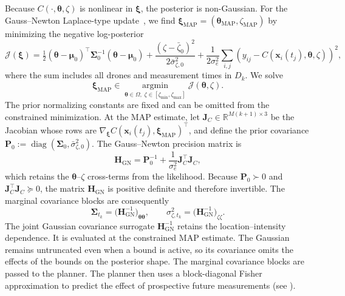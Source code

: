 \documentclass{article}
\DeclareMathOperator{\diag}{diag}
\newcommand{\R}{\mathbb{R}}
\newcommand{\bs}[1]{\boldsymbol{#1}}
\newcommand{\x}{\mathbf{x}}
\begin{document}
Because $C(\cdot,\bs\theta,\zeta)$ is nonlinear in $\bs\xi$, the posterior is non-Gaussian.
For the Gauss--Newton Laplace-type update~\cite{laplace_approx}, we find $\bs\xi_{\text{MAP}}=(\bs\theta_{\text{MAP}},\zeta_{\text{MAP}})$ by minimizing the negative log-posterior
\begin{equation}
\label{eq:neg_log_post}
\mathcal J(\bs\xi)=
\tfrac12(\bs\theta-\bs\mu_0)^\top\bs\Sigma_0^{-1}(\bs\theta-\bs\mu_0)
+\frac{(\zeta-\bar\zeta_0)^2}{2\bar\sigma_{\zeta,0}^2}
+\frac{1}{2\sigma_e^2}\sum_{i,j}
\!\left(y_{ij}-C(\x_i(t_j),\bs\theta,\zeta)\right)^2,
\end{equation}
where the sum includes all drones and measurement times in $D_k$.
We solve
\begin{equation}
\bs\xi_{\mathrm{MAP}}
\in \operatorname*{argmin}_{\bs\theta\in\Omega,\;\zeta\in[\zeta_{\min},\zeta_{\max}]}
\mathcal J(\bs\theta,\zeta).
\end{equation}
The prior normalizing constants are fixed and can be omitted from the constrained minimization.
At the MAP estimate, let $\bs J_C\in\R^{M(k+1)\times3}$ be the Jacobian whose rows are $\nabla_{\bs\xi}C(\x_i(t_j),\bs\xi_{\mathrm{MAP}})^\top$, and define the prior covariance $\bs P_0:=\diag(\bs\Sigma_0,\bar\sigma_{\zeta,0}^2)$.
The Gauss--Newton precision matrix is
\begin{equation}
\label{eq:gauss_newton_precision}
\bs H_{\mathrm{GN}}
=\bs P_0^{-1}+\frac{1}{\sigma_e^2}\bs J_C^\top\bs J_C,
\end{equation}
which retains the $\bs\theta$--$\zeta$ cross-terms from the likelihood.
Because $\bs P_0\succ0$ and $\bs J_C^\top\bs J_C\succeq0$, the matrix $\bs H_{\mathrm{GN}}$ is positive definite and therefore invertible.
The marginal covariance blocks are consequently
\begin{equation}
\label{eq:laplace_cov}
\bs\Sigma_{t_k} = \bigl(\bs H_{\mathrm{GN}}^{-1}\bigr)_{\bs\theta\bs\theta},
\qquad
\sigma_{\zeta,t_k}^2 = \bigl(\bs H_{\mathrm{GN}}^{-1}\bigr)_{\zeta\zeta}.
\end{equation}
The joint Gaussian covariance surrogate $\bs H_{\mathrm{GN}}^{-1}$ retains the location--intensity dependence.
It is evaluated at the constrained MAP estimate.
The Gaussian remains untruncated even when a bound is active, so its covariance omits the effects of the bounds on the posterior shape.
The marginal covariance blocks are passed to the planner.
The planner then uses a block-diagonal Fisher approximation to predict the effect of prospective future measurements (see ).
\end{document}
